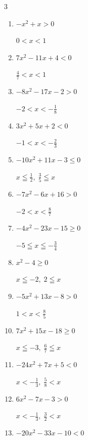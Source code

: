 \begin{multicols}{3}
\begin{enumerate}
  \item $-x^{2}+x>0$

        $\displaystyle 0 < x < 1$

  \item $7x^{2}-11x+4<0$

        $\displaystyle \frac{4}{7} < x < 1$

  \item $-8x^{2}-17x-2>0$

        $\displaystyle -2 < x < -\frac{1}{8}$

  \item $3x^{2}+5x+2<0$

        $\displaystyle -1 < x < -\frac{2}{3}$

  \item $-10x^{2}+11x-3\leq 0$

        $\displaystyle x \leqq \frac{1}{2} , \; \frac{3}{5} \leqq x$

  \item $-7x^{2}-6x+16>0$

        $\displaystyle -2 < x < \frac{8}{7}$

  \item $-4x^{2}-23x-15\geq 0$

        $\displaystyle -5 \leqq x \leqq -\frac{3}{4}$

  \item $x^{2}-4\geq 0$

        $\displaystyle x \leqq -2 , \; 2 \leqq x$

\columnbreak %

\resetques

  \item $-5x^{2}+13x-8>0$

        $\displaystyle 1 < x < \frac{8}{5}$

  \item $7x^{2}+15x-18\geq 0$

        $\displaystyle x \leqq -3 , \; \frac{6}{7} \leqq x$

  \item $-24x^{2}+7x+5<0$

        $\displaystyle x < -\frac{1}{3} , \; \frac{5}{8} < x$

  \item $6x^{2}-7x-3>0$

        $\displaystyle x < -\frac{1}{3} , \; \frac{3}{2} < x$

  \item $-20x^{2}-33x-10<0$


\end{enumerate}
\end{multicols}

